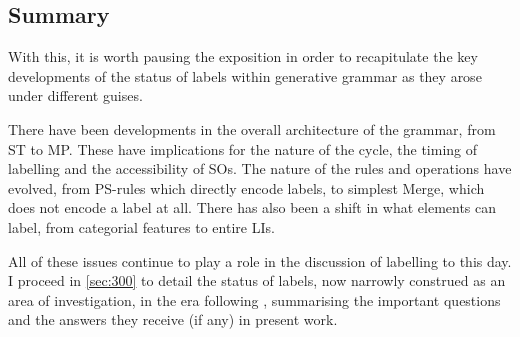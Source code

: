 \subsection{Summary}\label{sec:270}

With this, it is worth pausing the exposition in order to recapitulate the key developments of the status of labels within generative grammar as they arose under different guises.

There have been developments in the overall architecture of the grammar, from ST to MP. These have implications for the nature of the cycle, the timing of labelling and the accessibility of SOs. The nature of the rules and operations have evolved, from PS-rules which directly encode labels, to simplest Merge, which does not encode a label at all. There has also been a shift in what elements can label, from categorial features to entire LIs.

All of these issues continue to play a role in the discussion of labelling to this day. I proceed in \autoref{sec:300} to detail the status of labels, now narrowly construed as an area of investigation, in the era following \textcite{ChomskyN_2013}, summarising the important questions and the answers they receive (if any) in present work.
